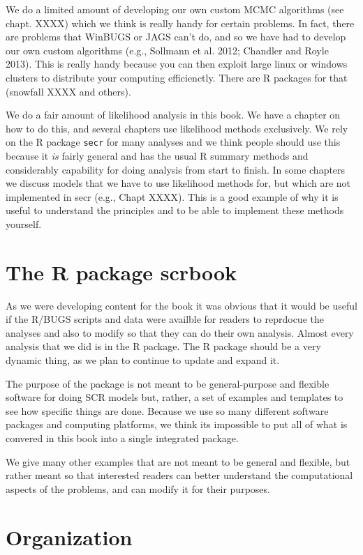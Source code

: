 We do a limited amount of developing our own custom MCMC algorithms
(see chapt. XXXX) which we think is really handy for certain
problems. In fact, there are problems that WinBUGS or JAGS can't do,
and so we have had to develop our own custom algorithms (e.g.,
Sollmann et al. 2012; Chandler and Royle 2013). This is really handy
because you can then exploit large linux or windows clusters to
distribute your computing efficienctly. There are R packages for that
(snowfall XXXX and others). 

We do a fair amount of likelihood analysis in this book. We have a
chapter on how to do this, and several chapters use likelihood methods
exclusively. We rely 
on the R package \mbox{\tt secr} \citep{efford_etal:2009euring} for
many analyses and we think people should use this because it {\it is}
fairly general and has the usual R summary methods and considerably
capability for doing analysis from start to finish. In some chapters
we discuss models that we have to use likelihood methods for, but
which are not implemented in secr  (e.g., Chapt XXXX). This is a good
example of why it
is useful to understand the principles and to be able to implement
these methods yourself. 


\section{The R package scrbook}

As we were developing content for the book it was obvious that it
would be useful if the
R/BUGS scripts and data were availble for readers to reprdocue the
analyses and also to modify so that they can do their own analysis. 
Almost every analysis that we did is in the R package. The R package
should be a very dynamic thing, as we plan to 
 continue to update and expand it.

The purpose of the package is  not meant to be general-purpose and
flexible software for doing SCR models but, rather, a set of examples
and templates to see how specific things are done.   Because we use so
many different software packages and computing platforms, we think its
impossible to put all of what is convered in this book into a single
integrated package. 

We give many other examples
that are not meant to be general and flexible, but rather meant so that
 interested readers can better understand the computational
aspects of the problems, and can modify it for their purposes.


\section{Organization}

